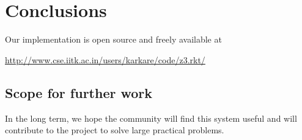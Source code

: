 \chapter{Conclusions}

Our implementation is open source and freely available at
\begin{center}
\url{http://www.cse.iitk.ac.in/users/karkare/code/z3.rkt/}
\end{center}

\section{Scope for further work}

In the long term, we hope the community will find this system useful and will
contribute to the project to solve large practical problems.
